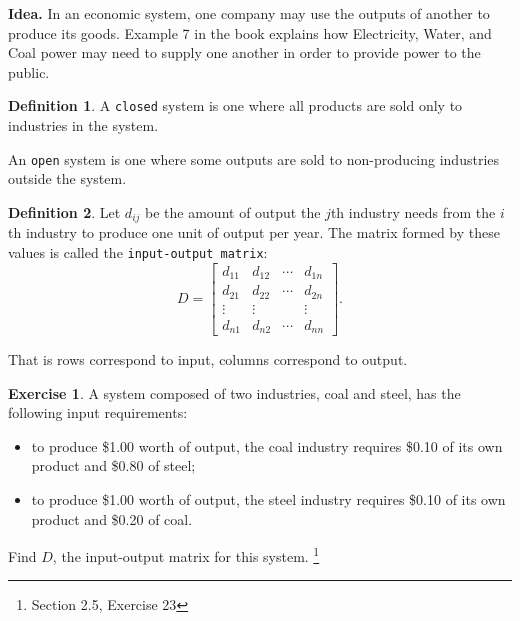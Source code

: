 \documentclass[handout]{beamer}
\newcommand{\blfootnote}[1]{%
	\begingroup
	\renewcommand\thefootnote{}\footnote{#1}%
	\addtocounter{footnote}{-1}%
	\endgroup
}
\newcommand{\fn}{\insertframenumber}
\theoremstyle{definition}
\newtheorem{exercise}{Exercise}
\newtheorem*{defn}{Definition}
\renewcommand{\emph}[1]{{\color{blue}\texttt{#1}}}
\begin{document}
\begin{frame}{\fn}
	\begin{block}{\textbf{Idea.}}
		In an economic system, one company may use the outputs of another to produce its goods.  Example 7 in the book explains how Electricity, Water, and Coal power may need to supply one another in order to provide power to the public.
	\end{block}
	\begin{defn}
		A \emph{closed} system is one where all products are sold only to industries in the system.
		
		An \emph{open} system is one where some outputs are sold to non-producing industries outside the system.
	\end{defn}
\end{frame}

\begin{frame}{\fn}
	\begin{defn}
		Let $d_{ij}$ be the amount of output the $j$th industry needs from the $i$th industry to produce one unit of output per year.  The matrix formed by these values is called the \emph{input-output matrix}:
		\[D=\begin{bmatrix}d_{11}&d_{12}&\cdots&d_{1n}\\
		d_{21}&d_{22}&\cdots&d_{2n}\\
		\vdots&\vdots&&\vdots\\
		d_{n1}&d_{n2}&\cdots&d_{nn}\end{bmatrix}.\]
		
		That is rows correspond to input, columns correspond to output.
	\end{defn}
\end{frame}
\begin{frame}{\fn}
	\begin{exercise}\label{IO_one}
		A system composed of two industries, coal and steel, has the following input requirements:
		\begin{itemize}[label=--]
			\item to produce \$1.00 worth of output, the coal industry requires \$0.10 of its own product and \$0.80 of steel;
			\item to produce \$1.00 worth of output, the steel industry requires \$0.10 of its own product and \$0.20 of coal.
		\end{itemize}
		Find $D$, the input-output matrix for this system.
		\blfootnote{Section 2.5, Exercise 23}
	\end{exercise}
\end{frame}
\end{document}
